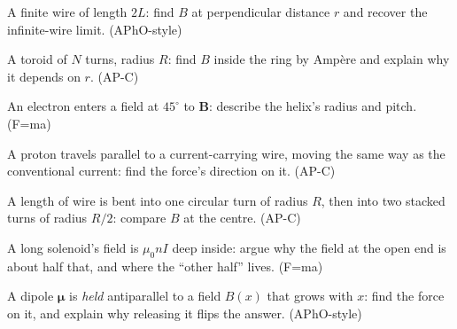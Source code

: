 \begin{exercise}[hard]
A finite wire of length $2L$: find $B$ at perpendicular distance $r$
and recover the infinite-wire limit. (APhO-style)
\end{exercise}
\begin{exercise}[medium]
A toroid of $N$ turns, radius $R$: find $B$ inside the ring by
Amp\`ere and explain why it depends on $r$. (AP-C)
\end{exercise}
\begin{exercise}[medium]
An electron enters a field at $45^{\circ}$ to $\mathbf B$: describe
the helix's radius and pitch. (F=ma)
\end{exercise}
\begin{exercise}[easy]
A proton travels parallel to a current-carrying wire, moving the same
way as the conventional current: find the force's direction on it.
(AP-C)
\end{exercise}
\begin{exercise}[medium]
A length of wire is bent into one circular turn of radius $R$, then
into two stacked turns of radius $R/2$: compare $B$ at the centre.
(AP-C)
\end{exercise}
\begin{exercise}[medium]
A long solenoid's field is $\mu_0nI$ deep inside: argue why the field
at the open end is about half that, and where the ``other half''
lives. (F=ma)
\end{exercise}
\begin{exercise}[hard]
A dipole $\boldsymbol\mu$ is \emph{held} antiparallel to a field
$B(x)$ that grows with $x$: find the force on it, and explain why
releasing it flips the answer. (APhO-style)
\end{exercise}
